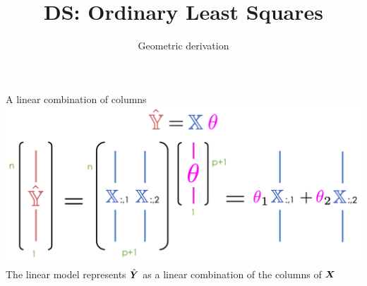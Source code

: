 \documentclass[aspectratio=169]{../latex_main/tntbeamer}  %
\title[Regression]{DS: Ordinary Least Squares}
\subtitle{Geometric derivation}
\begin{document}
	
	\maketitle
	\begin{frame}{A linear combination of columns}
	    \includegraphics[scale=.4]{Bild5}\\
	    The linear model represents  ${\hat{\bm{Y}}}$     as a linear combination of the columns of     $\bm{X}$ 
	\end{frame}
	
\end{document}
